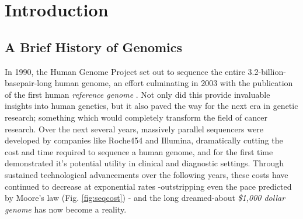 \chapter{Introduction}
\label{introduction}
\setcounter{figure}{-1}
\setcounter{table}{-1}
\setcounter{section}{-1}

\setlength\parindent{0pt}

\section{A Brief History of Genomics}

In 1990, the Human Genome Project \cite{olson1993human} set out to sequence the entire 3.2-billion-basepair-long human genome, an effort culminating in 2003 with the publication of the first human \textit{reference genome} \cite{international2004finishing}. Not only did this provide invaluable insights into human genetics, but it also paved the way for the next era in genetic research; something which would completely transform the field of cancer research. Over the next several years, massively parallel sequencers were developed by companies like Roche454 and Illumina, dramatically cutting the cost and time required to sequence a human genome, and for the first time demonstrated it's potential utility in clinical and diagnostic settings. Through sustained technological advancements over the following years, these costs have continued to decrease at exponential rates -outstripping even the pace predicted by Moore's law (Fig. \ref{fig:seqcost}) - and the long dreamed-about \textit{\$1,000 dollar genome} \cite{thousanddollargenome} \cite{sequencingcostsNHGRI} has now become a reality.

